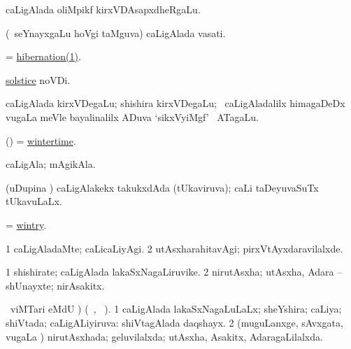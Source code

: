 \bentry
{}
\gl{\nA}
\bmng
caLigAlada oliMpikf kirxVDAsapxdheRgaLu. 
\emng
\eentry

\bentry
{}
\gl{\nA}
\bmng
(\kanmu\ seYnayxgaLu hoVgi taMguva) caLigAlada vasati. 
\emng
\eentry

\bentry
{}
\gl{\nA}
\bmng
= \hyperref{kandict_h.pdf}{H}{hibernation(1)}{hibernation(1)}. 
\emng
\eentry

\bentry
{}
\gl{\nA}
\bmng
\hyperref{kandict_s.pdf}{S}{solstice}{solstice} noVDi. 
\emng
\eentry

\bentry
{}
\gl{\nA}
\bmng
caLigAlada kirxVDegaLu; shishira kirxVDegaLu; \kanmu\ caLigAladalilx himagaDeDx \mo vugaLa meVle bayalinalilx ADuva `sikxVyiMgf' \mo\ ATagaLu. 
\emng
\eentry

\bentry
{}
\gl{\nA}
\bmng
(\kAparx) = \hyperlink{wintertime}{wintertime}. 
\emng
\eentry

\bentry
{}
\gl{\nA}
\bmng
caLigAla; mAgikAla. 
\emng
\eentry

\bentry
{}
\gl{\gu}
\bmng
(uDupina \vi) caLigAlakekx takukxdAda (tUkaviruva); caLi taDeyuvaSuTx tUkavuLaLx. 
\emng
\eentry

\bentry
{}
\gl{\gu}
\bmng
= \hyperlink{wintry}{wintry}. 
\emng
\eentry

\bentry
{}
\gl{\kirxvi}
\bmng
\bnum
\num{1} caLigAladaMte; caLicaLiyAgi. 
\num{2} utAsxharahitavAgi; pirxVtAyxdaravilalxde. 
\enum
\emng
\eentry

\bentry
{}
\gl{\nA}
\bmng
\bnum
\num{1} shishirate; caLigAlada lakaSxNagaLiruvike. 
\num{2} nirutAsxha; utAsxha, Adara -- shUnayxte; nirAsakitx. 
\enum
\emng
\eentry

\bentry
{}
\gl{\gu}  \ucAcx\ viMTari eMdU \parx) (\tara\ , \tama\ ).
\bmng
\bnum
\num{1} caLigAlada lakaSxNagaLuLaLx; sheYshira; caLiya; shiVtada; caLigALiyiruva:  shiVtagAlada daqshayx. 
\num{2} (muguLanxge, sAvxgata, \mo vugaLa \vi) nirutAsxhada; geluvilalxda; utAsxha, Asakitx, AdaragaLilalxda. 
\enum
\emng
\eentry

